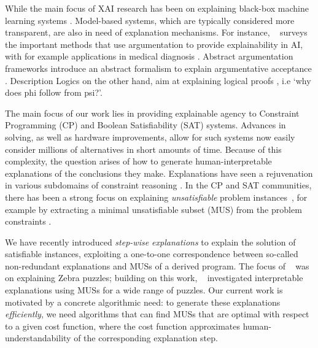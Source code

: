 \documentclass[twoside,11pt]{article}
\newcommand\citet[1]{\citeauthor{#1}~\citeyear{#1}}
\begin{document}
While the main focus of XAI research has been on explaining black-box machine learning systems . Model-based systems, which are typically considered more transparent, are also in need of explanation mechanisms. 
For instance, \citet{vassiliades2021argumentation} surveys the important methods that use argumentation  to provide explainability in AI, with for example applications in medical diagnosis . Abstract argumentation frameworks introduce an abstract formalism to explain argumentative acceptance \cite{vsevselja2013abstract,liao2020explanation,ulbricht2021strong}. Description Logics \cite{baader2004description} on the other hand, aim at explaining logical proofs , i.e `why does phi follow from psi?'. 

The main focus of our work lies in providing explainable agency \cite{langley2017explainable} to Constraint Programming (CP) \cite{fai/Rossi06} and Boolean Satisfiability (SAT)  systems.
Advances in solving, as well as hardware improvements, allow for such systems now easily consider millions of alternatives in short amounts of time.
Because of this complexity, the question arises of how to generate human-interpretable explanations of the conclusions they make. 
Explanations have seen a rejuvenation in various subdomains of constraint reasoning .
In the CP and SAT communities, there has been a strong focus on explaining \textit{unsatisfiable} problem instances~\cite{junker2001quickxplain}, for example by extracting a minimal unsatisfiable subset (MUS) from the problem constraints \cite{DBLP:journals/jar/LiffitonS08}. 

We have recently introduced \emph{step-wise explanations} \cite{ecai/BogaertsGCG20} to explain the solution of satisfiable instances, exploiting a one-to-one correspondence between so-called non-redundant explanations and MUSs of a derived program. The focus of \citet{ecai/BogaertsGCG20} was on explaining Zebra puzzles; building on this work, \citet{schotten} investigated interpretable explanations using MUSs for a wide range of puzzles.  
Our current work is motivated by a concrete algorithmic need: to generate these explanations \emph{efficiently}, we need algorithms that can find MUSs that are optimal with respect to a given cost function, where the cost function approximates human-understandability of the corresponding explanation step. 
\end{document}
